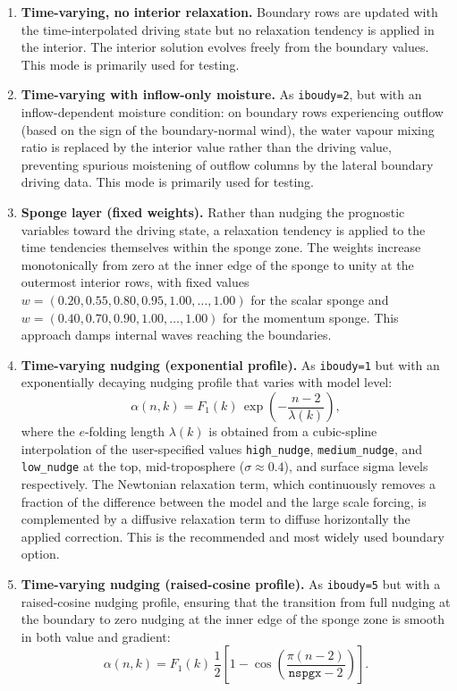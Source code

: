 {\begin{enumerate}
\item[\texttt{iboudy=2}] \textbf{Time-varying, no interior relaxation.}
Boundary rows are updated with the time-interpolated driving state but no
relaxation tendency is applied in the interior. The interior solution evolves
freely from the boundary values. This mode is primarily used for testing.

\item[\texttt{iboudy=3}] \textbf{Time-varying with inflow-only moisture.}
As \texttt{iboudy=2}, but with an inflow-dependent moisture condition: on
boundary rows experiencing outflow (based on the sign of the boundary-normal
wind), the water vapour mixing ratio is replaced by the interior value rather
than the driving value, preventing spurious moistening of outflow columns by
the lateral boundary driving data. This mode is primarily used for testing.

\item[\texttt{iboudy=4}] \textbf{Sponge layer (fixed weights).}
Rather than nudging the prognostic variables toward the driving state, a
relaxation tendency is applied to the time tendencies themselves within the
sponge zone. The weights increase monotonically from zero at the inner edge
of the sponge to unity at the outermost interior rows, with fixed values
$w = (0.20, 0.55, 0.80, 0.95, 1.00, \ldots, 1.00)$ for the scalar sponge
and $w = (0.40, 0.70, 0.90, 1.00, \ldots, 1.00)$ for the momentum sponge.
This approach damps internal waves reaching the boundaries.

\item[\texttt{iboudy=5}] \textbf{Time-varying nudging (exponential profile).}
As \texttt{iboudy=1} but with an exponentially decaying nudging profile
that varies with model level:
\begin{equation}
  \alpha(n,k) = F_1(k)\,\exp\!\left(-\frac{n-2}{\lambda(k)}\right),
\end{equation}
where the $e$-folding length $\lambda(k)$ is obtained from a cubic-spline
interpolation of the user-specified values \texttt{high\_nudge},
\texttt{medium\_nudge}, and \texttt{low\_nudge} at the top, mid-troposphere
($\sigma \approx 0.4$), and surface sigma levels respectively.
The Newtonian relaxation term, which continuously removes a
fraction of the difference between the model and the large scale forcing, is
complemented by a diffusive relaxation term to diffuse horizontally the
applied correction.
This is the recommended and most widely used boundary option.

\item[\texttt{iboudy=6}] \textbf{Time-varying nudging (raised-cosine profile).}
As \texttt{iboudy=5} but with a raised-cosine nudging profile, ensuring that
the transition from full nudging at the boundary to zero nudging at the inner
edge of the sponge zone is smooth in both value and gradient:
\begin{equation}
  \alpha(n,k) = F_1(k)\,\frac{1}{2}\!\left[1 -
    \cos\!\left(\frac{\pi(n-2)}{\texttt{nspgx}-2}\right)\right].
\end{equation}


\end{enumerate}}
